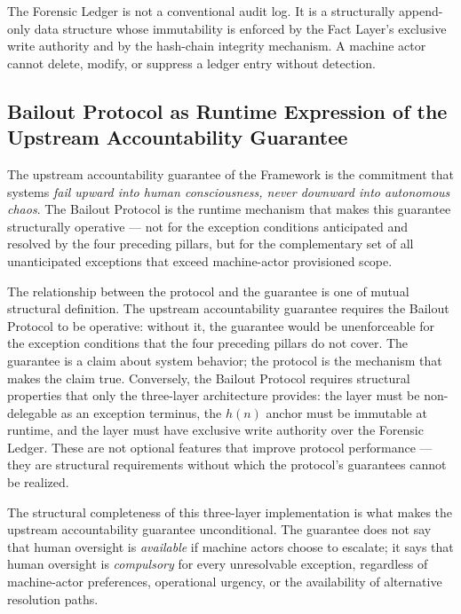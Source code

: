 The Forensic Ledger is not a conventional audit log. It is a structurally append-only data structure whose immutability is enforced by the Fact Layer's exclusive write authority and by the hash-chain integrity mechanism. A machine actor cannot delete, modify, or suppress a ledger entry without detection.

\subsection{Bailout Protocol as Runtime Expression of the Upstream Accountability Guarantee}\label{sec:runtime-expression}

The upstream accountability guarantee of the \bxthree{} Framework is the commitment that \bxthree{} systems \emph{fail upward into human consciousness, never downward into autonomous chaos}. The Bailout Protocol is the runtime mechanism that makes this guarantee structurally operative — not for the exception conditions anticipated and resolved by the four preceding pillars, but for the complementary set of all unanticipated exceptions that exceed machine-actor provisioned scope.

The relationship between the protocol and the guarantee is one of mutual structural definition. The upstream accountability guarantee requires the Bailout Protocol to be operative: without it, the guarantee would be unenforceable for the exception conditions that the four preceding pillars do not cover. The guarantee is a claim about system behavior; the protocol is the mechanism that makes the claim true. Conversely, the Bailout Protocol requires structural properties that only the \bxthree{} three-layer architecture provides: the \purpose{} layer must be non-delegable as an exception terminus, the $h(n)$ anchor must be immutable at runtime, and the \fact{} layer must have exclusive write authority over the Forensic Ledger. These are not optional features that improve protocol performance — they are structural requirements without which the protocol's guarantees cannot be realized.

The structural completeness of this three-layer implementation is what makes the upstream accountability guarantee unconditional. The guarantee does not say that human oversight is \emph{available} if machine actors choose to escalate; it says that human oversight is \emph{compulsory} for every unresolvable exception, regardless of machine-actor preferences, operational urgency, or the availability of alternative resolution paths.

